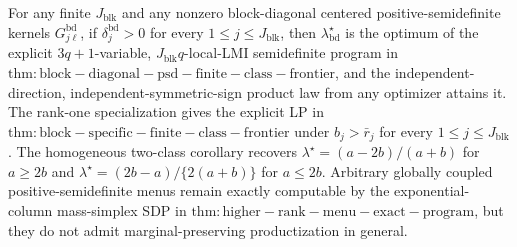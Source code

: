 For any finite \(J_{\mathrm{blk}}\) and any nonzero block-diagonal centered positive-semidefinite kernels \(G^{\mathrm{bd}}_{j\ell}\), if \(\delta_j^{\mathrm{bd}}>0\) for every \(1\le j\le J_{\mathrm{blk}}\), then \(\lambda_{\mathrm{bd}}^\star\) is the optimum of the explicit \(3q+1\)-variable, \(J_{\mathrm{blk}}q\)-local-LMI semidefinite program in \(\mathrm{thm:block-diagonal-psd-finite-class-frontier}\), and the independent-direction, independent-symmetric-sign product law from any optimizer attains it.  The rank-one specialization gives the explicit LP in \(\mathrm{thm:block-specific-finite-class-frontier}\) under \(b_j>\bar r_j\) for every \(1\le j\le J_{\mathrm{blk}}\).  The homogeneous two-class corollary recovers \(\lambda^\star=(a-2b)/(a+b)\) for \(a\ge2b\) and \(\lambda^\star=(2b-a)/\{2(a+b)\}\) for \(a\le2b\).  Arbitrary globally coupled positive-semidefinite menus remain exactly computable by the exponential-column mass-simplex SDP in \(\mathrm{thm:higher-rank-menu-exact-program}\), but they do not admit marginal-preserving productization in general.